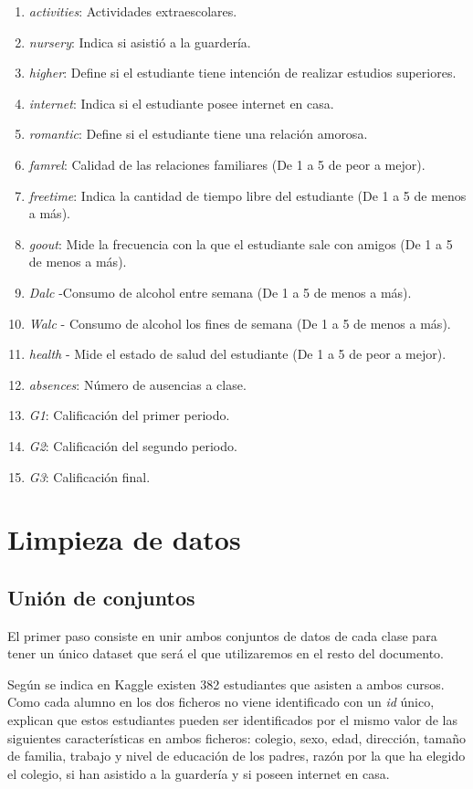 \documentclass[12pt,a4paper]{article}
\begin{document}
\begin{enumerate}
	\item \textit{activities}: Actividades extraescolares.
	\item \textit{nursery}: Indica si asistió a la guardería. 
	\item \textit{higher}: Define si el estudiante tiene intención de  realizar estudios superiores.
	\item \textit{internet}: Indica si el estudiante posee internet en casa.
	\item \textit{romantic}: Define si el estudiante tiene una relación amorosa. 
	\item \textit{famrel}: Calidad de las relaciones familiares (De 1 a 5 de peor a mejor).
	\item \textit{freetime}: Indica la cantidad de tiempo libre del estudiante (De 1 a 5 de menos a más).
	\item \textit{goout}: Mide la frecuencia con la que el estudiante sale con amigos (De 1 a 5 de menos a más).
	\item \textit{Dalc} -Consumo de alcohol entre semana (De 1 a 5 de menos a más).
	\item \textit{Walc} - Consumo de alcohol los fines de semana (De 1 a 5 de menos a más).
	\item \textit{health} - Mide el estado de salud del estudiante (De 1 a 5 de peor a mejor).
	\item \textit{absences}: Número de ausencias a clase.
	\item \textit{G1}: Calificación del primer periodo.
	\item \textit{G2}: Calificación del segundo periodo.
	\item \textit{G3}: Calificación final.
\end{enumerate}




\section{Limpieza de datos}
\subsection{Unión de conjuntos}
El primer paso consiste en unir ambos conjuntos de datos de cada clase para tener un único dataset que será el que utilizaremos en el resto del documento.

Según se indica en Kaggle existen 382 estudiantes que asisten a ambos cursos. Como cada alumno en los dos ficheros no viene identificado con un \textit{id} único, explican que estos estudiantes pueden ser identificados por el mismo valor de las siguientes características en ambos ficheros: colegio, sexo, edad, dirección, tamaño de familia, trabajo y nivel de educación de los padres, razón por la que ha elegido el colegio, si han asistido a la guardería y si poseen internet en casa. 
\end{document}
